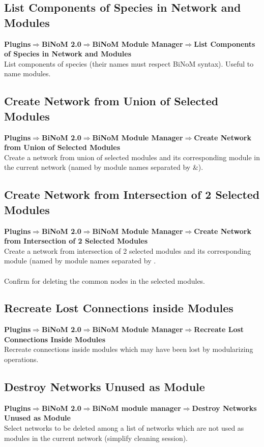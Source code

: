 \subsection{List Components of Species in Network and Modules}
\textbf{Plugins$\Rightarrow$BiNoM 2.0$\Rightarrow$BiNoM Module Manager$\Rightarrow$List Components of Species in Network and Modules}\\
List components of species (their names must respect BiNoM syntax). Useful to name modules.

\subsection{Create Network from Union of Selected Modules}
\textbf{Plugins$\Rightarrow$BiNoM 2.0$\Rightarrow$BiNoM Module Manager$\Rightarrow$Create Network from Union of Selected Modules}\\
Create a network from union of selected modules and its corresponding module in the current network (named by module names separated by \&).

\subsection{Create Network from Intersection of 2 Selected Modules}
\textbf{Plugins$\Rightarrow$BiNoM 2.0$\Rightarrow$BiNoM Module Manager$\Rightarrow$Create Network from Intersection of 2 Selected Modules}\\
Create a network from intersection of 2 selected modules and its corresponding module (named by module names separated by \textbar.\\\\
Confirm for deleting the common nodes in the selected modules.

\subsection{Recreate Lost Connections inside Modules}
\textbf{Plugins$\Rightarrow$BiNoM 2.0$\Rightarrow$BiNoM Module Manager$\Rightarrow$Recreate Lost Connections Inside Modules}\\
Recreate connections inside modules which may have been lost by modularizing operations.

\subsection{Destroy Networks Unused as Module}
\textbf{Plugins$\Rightarrow$BiNoM 2.0$\Rightarrow$BiNoM module manager$\Rightarrow$Destroy Networks Unused as Module}\\
Select networks to be deleted among a list of networks which are not used as modules in the current network (simplify cleaning session).